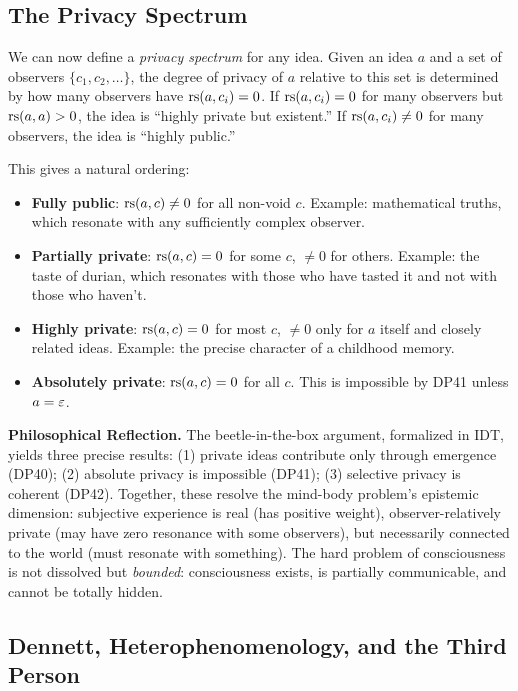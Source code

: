 \subsection{The Privacy Spectrum}

We can now define a \emph{privacy spectrum} for any idea.  Given an idea $a$
and a set of observers $\{c_1, c_2, \ldots\}$, the degree of privacy of $a$
relative to this set is determined by how many observers have $\mathrm{rs}(a, c_i) = 0$.
If $\mathrm{rs}(a, c_i) = 0$ for many observers but $\mathrm{rs}(a, a) > 0$, the idea is
``highly private but existent.''  If $\mathrm{rs}(a, c_i) \neq 0$ for many observers,
the idea is ``highly public.''

This gives a natural ordering:
\begin{itemize}
\item \textbf{Fully public}: $\mathrm{rs}(a, c) \neq 0$ for all non-void $c$.
  Example: mathematical truths, which resonate with any sufficiently
  complex observer.
\item \textbf{Partially private}: $\mathrm{rs}(a, c) = 0$ for some $c$, $\neq 0$
  for others.  Example: the taste of durian, which resonates with those
  who have tasted it and not with those who haven't.
\item \textbf{Highly private}: $\mathrm{rs}(a, c) = 0$ for most $c$, $\neq 0$
  only for $a$ itself and closely related ideas.  Example: the precise
  character of a childhood memory.
\item \textbf{Absolutely private}: $\mathrm{rs}(a, c) = 0$ for all $c$.  This
  is impossible by DP41 unless $a = \varepsilon$.
\end{itemize}

\begin{reflectionbox}
\noindent\textbf{Philosophical Reflection.}
The beetle-in-the-box argument, formalized in IDT, yields three precise
results: (1) private ideas contribute only through emergence (DP40); (2)
absolute privacy is impossible (DP41); (3) selective privacy is coherent
(DP42).  Together, these resolve the mind-body problem's epistemic dimension:
subjective experience is real (has positive weight), observer-relatively
private (may have zero resonance with some observers), but necessarily
connected to the world (must resonate with something).  The hard problem of
consciousness is not dissolved but \emph{bounded}: consciousness exists, is
partially communicable, and cannot be totally hidden.
\end{reflectionbox}

\subsection{Dennett, Heterophenomenology, and the Third Person}

